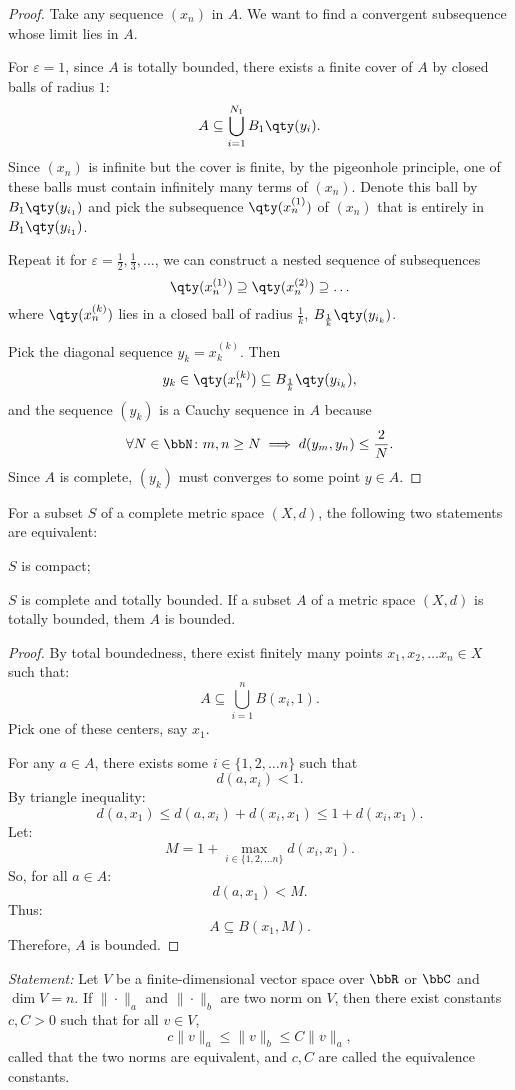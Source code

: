 \documentclass[a4paper,12pt]{article}
\begin{document}
\begin{proof}
Take any sequence $(x_n)$ in $A$. We want to find a convergent subsequence whose limit lies in $A$.

For $\varepsilon=1$, since $A$ is totally bounded, there exists a finite cover of $A$ by closed balls of radius $1$:
    \[A\subseteq\bigcup_{i=1}^{N_1}B_1\qty(y_i).\]
    Since $(x_n)$ is infinite but the cover is finite, by the pigeonhole principle, one of these balls must contain infinitely many terms of $(x_n)$. Denote this ball by $B_1\qty(y_{i_1})$ and pick the subsequence $\qty(x_n^{(1)})$ of $(x_n)$ that is entirely in $B_1\qty(y_{i_1})$.

    Repeat it for $\varepsilon=\frac{1}{2},\frac{1}{3},\ldots$, we can construct a nested sequence of subsequences
    \[\qty(x_n^{(1)})\supseteq \qty(x_n^{(2)})\supseteq\ldots\]
    where $\qty(x_n^{(k)})$ lies in a closed ball of radius $\frac{1}{k}$, $B_{\frac{1}{k}}\qty(y_{i_k})$.

    Pick the diagonal sequence $y_k=x_k^{(k)}$. Then
    \[y_k\in\qty(x_n^{(k)})\subseteq B_{\frac{1}{k}}\qty(y_{i_k}),\]
    and the sequence $(y_k)$ is a Cauchy sequence in $A$ because
    \[\forall N\in\bbN\colon m,n\geq N\implies d(y_m,y_n)\leq\frac{2}{N}.\]
    Since $A$ is complete, $(y_k)$ must converges to some point $y\in A$.
\end{proof}
For a subset $S$ of a complete metric space $(X,d)$, the following two statements are equivalent:
\bit
\item $S$ is compact;
\item $S$ is complete and totally bounded.
\eit
{}
 If a subset $A$ of a metric space $(X,d)$ is totally bounded, them $A$ is bounded.

\begin{proof}
By total boundedness, there exist finitely many points $x_1,x_2,\ldots x_n\in X$ such that:
\[A\subseteq\bigcup_{i=1}^nB(x_i,1).\]
Pick one of these centers, say $x_1$.

For any $a\in A$, there exists some $i\in\{1,2,\ldots n\}$ such that
\[d(a,x_i)<1.\]
By triangle inequality:
\[d(a,x_1)\leq d(a,x_i)+d(x_i,x_1)\leq 1+d(x_i,x_1).\]
Let:
\[M=1+\max_{i\in\{1,2,\ldots n\}}d(x_i,x_1).\]
So, for all $a\in A$:
\[d(a,x_1)<M.\]
Thus:
\[A\subseteq B(x_1,M).\]
Therefore, $A$ is bounded.
\end{proof}
\textit{Statement: }Let $V$ be a finite-dimensional vector space over $\bbR$ or $\bbC$ and $\dim V=n$. If $\|\cdot\|_a
$ and $\|\cdot\|_b$ are two norm on $V$, then there exist constants $c,C>0$ such that for all $v\in V$,
\[c\|v\|_a\leq\|v\|_b\leq C\|v\|_a,\]
called that the two norms are equivalent, and $c,C$ are called the equivalence constants.
\end{document}
